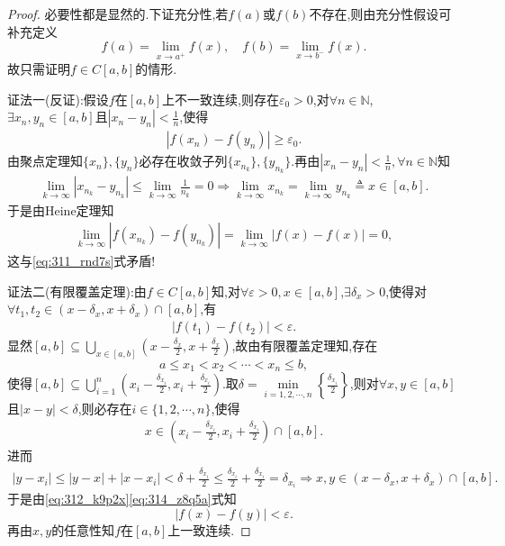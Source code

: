 \documentclass[../../main.tex]{subfiles}%
\begin{document}
\begin{proof}

必要性都是显然的.下证充分性,若$f(a)$或$f(b)$不存在,则由充分性假设可补充定义
$$f(a)=\lim\limits_{x\rightarrow a^+}f(x),\quad f(b)=\lim\limits_{x\rightarrow b^-}f(x).$$
故只需证明$f\in C[a,b]$的情形.

{\color{blue}证法一(反证):}假设$f$在$[a,b]$上不一致连续,则存在$\varepsilon_0>0$,对$\forall n\in \mathbb{N}$,$\exists x_n,y_n\in [a,b]$且$|x_n-y_n|<\frac{1}{n}$,使得
\begin{align}
|f(x_n)-f(y_n)|\geqslant \varepsilon_0. \label{eq:311_rnd7s}
\end{align}
由聚点定理知$\{x_n\},\{y_n\}$必存在收敛子列$\{x_{n_k}\},\{y_{n_k}\}$.再由$|x_n-y_n|<\frac{1}{n},\forall n\in \mathbb{N}$知
\begin{align*}
\lim\limits_{k\rightarrow \infty}|x_{n_k}-y_{n_k}|\leqslant \lim\limits_{k\rightarrow \infty}\frac{1}{n_k}=0\Longrightarrow \lim\limits_{k\rightarrow \infty}x_{n_k}=\lim\limits_{k\rightarrow \infty}y_{n_k}\triangleq x\in [a,b].
\end{align*}
于是由Heine定理知
\begin{align*}
\lim\limits_{k\rightarrow \infty}|f(x_{n_k})-f(y_{n_k})|=\lim\limits_{k\rightarrow \infty}|f(x)-f(x)|=0,
\end{align*}
这与\eqref{eq:311_rnd7s}式矛盾!

{\color{blue}证法二(有限覆盖定理):}由$f\in C[a,b]$知,对$\forall \varepsilon >0,x\in [a,b]$,$\exists \delta_x>0$,使得对$\forall t_1,t_2\in (x-\delta_x,x+\delta_x)\cap [a,b]$,有
\begin{align}
|f(t_1)-f(t_2)|<\varepsilon. \label{eq:312_k9p2x}
\end{align}
显然$[a,b]\subseteq \bigcup\limits_{x\in [a,b]}\left(x-\frac{\delta_x}{2},x+\frac{\delta_x}{2}\right)$,故由有限覆盖定理知,存在
$$a\leqslant x_1<x_2<\cdots <x_n\leqslant b,$$
使得$[a,b]\subseteq \bigcup\limits_{i=1}^n\left(x_i-\frac{\delta_{x_i}}{2},x_i+\frac{\delta_{x_i}}{2}\right)$.取$\delta =\min\limits_{i=1,2,\cdots ,n}\left\{\frac{\delta_{x_i}}{2}\right\}$,则对$\forall x,y\in [a,b]$且$|x-y|<\delta$,则必存在$i\in \{1,2,\cdots ,n\}$,使得
\begin{align}
x\in \left(x_i-\frac{\delta_{x_i}}{2},x_i+\frac{\delta_{x_i}}{2}\right)\cap [a,b]. \label{eq:314_z8q5a}
\end{align}
进而
\begin{align*}
|y-x_i|\leqslant |y-x|+|x-x_i|<\delta +\frac{\delta_{x_i}}{2}\leqslant \frac{\delta_{x_i}}{2}+\frac{\delta_{x_i}}{2}=\delta_{x_i}\Longrightarrow x,y\in (x-\delta_x,x+\delta_x)\cap [a,b].
\end{align*}
于是由\eqref{eq:312_k9p2x}\eqref{eq:314_z8q5a}式知
$$|f(x)-f(y)|<\varepsilon.$$
再由$x,y$的任意性知$f$在$[a,b]$上一致连续.
\end{proof}
\end{document}
